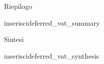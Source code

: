 \documentclass[a4paper]{article}
\newcommand{\SRE}{inserisci}
\begin{document}
\begin{centering}
\tabulinesep=1.5mm
\begin{flushleft}
Riepilogo
\end{flushleft}
\SRE{deferred_vat_summary}
\begin{flushleft}
Sintesi
\end{flushleft}
\SRE{deferred_vat_synthesis}
\end {centering}
\end{document}
